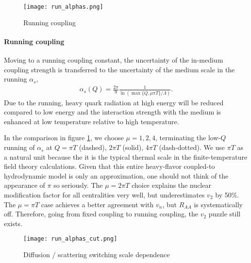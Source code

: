 \begin{figure}
\centering
\texttt{[image: run\_alphas.png]}
\caption{Running coupling}
\label{fig:new:run-a}
\end{figure}

\paragraph{Running coupling} Moving to a running coupling constant, the uncertainty of the in-medium coupling strength is transferred to the uncertainty of the medium scale in the running $\alpha_s$,
\begin{eqnarray}
\alpha_s(Q) = \frac{2\pi}{9}\frac{1}{\ln \left( \max\{Q, \mu\pi T\} / \Lambda\right)}.
\end{eqnarray}
Due to the running, heavy quark radiation at high energy will be reduced compared to low energy and the interaction strength with the medium is enhanced at low temperature relative to high temperature.

In the comparison in figure \ref{fig:new:run-a}, we choose $\mu = 1, 2, 4$, terminating the low-$Q$ running of $\alpha_s$ at $Q = \pi T$ (dashed), $2\pi T$ (solid), $4\pi T$ (dash-dotted).
We use $\pi T$ as a natural unit because the it is the typical thermal scale in the finite-temperature field theory calculations.
Given that this entire heavy-flavor coupled-to hydrodynamic model is only an approximation, one should not think of the appearance of $\pi$ so seriously.
The $\mu=2\pi T$ choice explains the nuclear modification factor for all centralities very well, but underestimates $v_2$ by 50\%.
The $\mu=\pi T$ case achieves a better agreement with $v_n$, but $R_{AA}$ is systematically off.
Therefore, going from fixed coupling to running coupling, the $v_2$ puzzle still exists.

\begin{figure}
\centering
\texttt{[image: run\_alphas\_cut.png]}
\caption{Diffusion / scattering switching scale dependence}
\label{fig:new:run-cut}
\end{figure}
